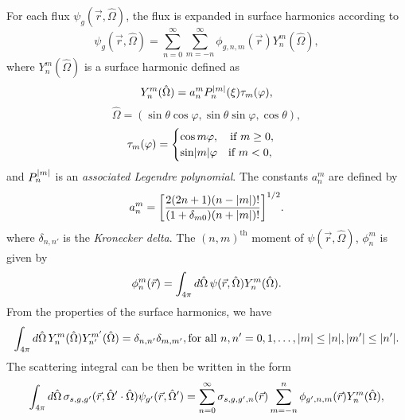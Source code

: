 For each flux $\psi_{g}(\vec{r},\hat{\Omega})$, the flux is expanded in surface harmonics according to
\begin{equation}
	\psi_{g}(\vec{r},\hat{\Omega}) = \sum_{n=0}^{\infty} \sum_{m=-n}^{\infty} \phi_{g,n,m}(\vec{r}) Y_{n}^{m}(\hat{\Omega}),
\end{equation}
where $Y_{n}^{m}(\hat{\Omega})$ is a surface harmonic defined as
\begin{equation}
	Y_{n}^{m}(\hat{\Omega}) = a_{n}^{m} P_{n}^{\lvert m\rvert}(\xi) \tau_{m}(\varphi),
\end{equation}
\begin{equation}
\hat{\Omega} = (\sin \theta \cos \varphi, \sin \theta \sin \varphi, \cos \theta),
\end{equation}
\begin{equation}
	\tau_{m}(\varphi) = \begin{cases}
					\cos m\varphi, \quad \text{if } m \geq 0, \\
					\sin \lvert m\rvert \varphi \quad \text{if } m < 0,
				      \end{cases}
\end{equation}
and $P_{n}^{\lvert m\rvert}$ is an \textit{associated Legendre polynomial}. The constants $a_{n}^{m}$ are defined by
\begin{equation}
	a_{n}^{m} = \bigg [ \frac{2(2n+1)(n-\lvert m\rvert)!}{(1+\delta_{m0})(n + \lvert m\rvert)!} \bigg ]^{1/2}.
\end{equation}
where $\delta_{n,n'}$ is the \textit{Kronecker delta}. The $(n,m)^{\text{th}}$ moment of $\psi(\vec{r}, \hat{\Omega})$, $\phi_{n}^{m}$ is given by
\begin{equation}
	\phi_{n}^{m}(\vec{r}) = \int_{4\pi} \mathop{}\!d \hat{\Omega} \, \psi(\vec{r},\hat{\Omega}) Y_{n}^{m}(\hat{\Omega}).
\end{equation}
From the properties of the surface harmonics, we have
\begin{equation}
	\int_{4\pi} \mathop{}\!d \hat{\Omega} \, Y_{n}^{m}(\hat{\Omega}) Y_{n'}^{m'}(\hat{\Omega}) = \delta_{n,n'} \delta_{m,m'}, \text{for all } n, n' = 0, 1, \dots, \lvert m\rvert \leq \lvert n\rvert, \lvert m'\rvert \leq \lvert n'\rvert.
\end{equation}
The scattering integral can be then be written in the form
\begin{equation}
	\int_{4\pi} \mathop{}\!d \hat{\Omega} \, \sigma_{s,g,g'}(\vec{r},\hat{\Omega}' \cdot \hat{\Omega}) \psi_{g'}(\vec{r},\hat{\Omega}') = \sum_{n=0}^{\infty} \sigma_{s,g,g',n}(\vec{r}) \sum_{m=-n}^{n} \phi_{g',n,m}(\vec{r})Y_{n}^{m}(\hat{\Omega}),
	\label{eq:ScattInt}
\end{equation}
